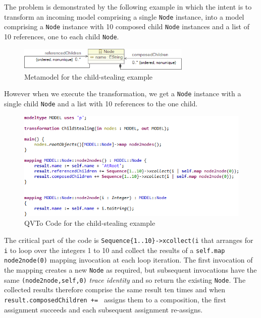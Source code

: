 \documentclass[runningheads,a4paper]{llncs}
\begin{document}
The problem is demonstrated by the following example in which the intent is to transform an incoming model comprising a single \verb|Node| instance, into a model comprising a \verb|Node| instance with 10 composed child \verb|Node| instances and a list of 10 references, one to each child \verb|Node|. 

\begin{figure}
  \begin{center}
    \includegraphics[width=3.25in]{ChildStealingMM.png}
  \end{center}
  \caption{Metamodel for the child-stealing example}
  \label{fig:CSMM}
\end{figure}

However when we execute the transformation, we get a \verb|Node| instance with a single child \verb|Node| and a list with 10 references to the one child.

\begin{figure}
  \begin{center}
    \includegraphics[width=4.75in]{ChildStealingCode.png}
  \end{center}
  \caption{QVTo Code for the child-stealing example}
  \label{fig:CSCode}
\end{figure}

The critical part of the code is \verb?Sequence{1..10}->xcollect(i? that arranges for \verb|i| to loop over the integers 1 to 10 and collect the results of a \verb|self.map node2node(0)| mapping invocation at each loop iteration. The first invocation of the mapping creates a new \verb|Node| as required, but subsequent invocations have the same \verb|(node2node,self,0)| \emph{trace identity} and so return the existing \verb|Node|. The collected results therefore comprise the same result ten times and when \verb|result.composedChildren += | assigns them to a composition, the first assignment succeeds and each subsequent assignment re-assigns.
\end{document}
